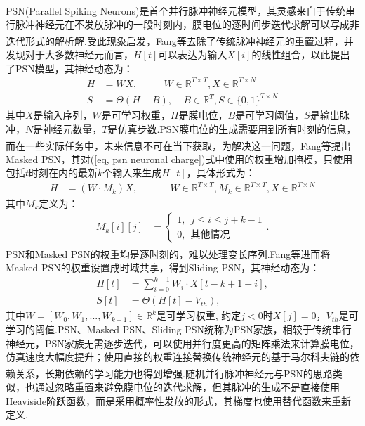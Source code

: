 \documentclass[10.5pt,compsoc,UTF8]{CjC}
\theoremstyle{mystyle}
\newcommand{\upcite}[1]{\textsuperscript{\cite{#1}}}
\begin{document}
\begin{multicols}{1}
PSN(Parallel Spiking Neurons)\upcite{fang2023parallel}是首个并行脉冲神经元模型，其灵感来自于传统串行脉冲神经元在不发放脉冲的一段时刻内，膜电位的逐时间步迭代求解可以写成非迭代形式的解析解.受此现象启发，Fang等\upcite{fang2023parallel}去除了传统脉冲神经元的重置过程，并发现对于大多数神经元而言，$H[t]$可以表达为输入$X[i]$的线性组合，以此提出了PSN模型，其神经动态为：
\begin{align}
	H &= WX, ~~~~~~~~~~~~W \in \mathbb{R}^{T \times T}, X \in \mathbb{R}^{T \times N} \label{eq, psn neuronal charge}\\
	S &= \Theta(H -B), ~~~~~B \in \mathbb{R}^{T}, S\in \{0, 1\}^{T \times N}
\end{align}
其中$X$是输入序列，$W$是可学习权重，$H$是膜电位，$B$是可学习阈值，$S$是输出脉冲，$N$是神经元数量，$T$是仿真步数.PSN膜电位的生成需要用到所有时刻的信息，而在一些实际任务中，未来信息不可在当下获取，为解决这一问题，Fang等\upcite{fang2023parallel}提出Masked PSN，其对(\ref{eq, psn neuronal charge})式中使用的权重增加掩模，只使用包括$t$时刻在内的最新$k$个输入来生成$H[t]$，具体形式为：
\begin{eqnarray}
	H &= (W \cdot M_{k})X, ~~~~~~~~~~~~~~~W \in \mathbb{R}^{T \times T}, M_{k} \in \mathbb{R}^{T \times T}, X \in \mathbb{R}^{T \times N}
\end{eqnarray}
其中$M_{k}$定义为：
\begin{eqnarray}
	M_{k}[i][j] &= \begin{cases}
		1, ~~ j \leq i \leq j + k - 1 \\
		0, ~~\text{其他情况}
	\end{cases}.
\end{eqnarray}
PSN和Masked PSN的权重均是逐时刻的，难以处理变长序列.Fang等\upcite{fang2023parallel}进而将Masked PSN的权重设置成时域共享，得到Sliding PSN，其神经动态为：
\begin{align}
	H[t] &= \sum_{i=0}^{k-1}W_{i}\cdot X[t - k + 1 + i], \\
	S[t] &= \Theta(H[t] - V_{th}),
\end{align}
其中$W = [W_{0}, W_{1}, ..., W_{k-1}] \in \mathbb{R}^{k}$是可学习权重, 约定$j < 0$时$X[j]=0$，$V_{th}$是可学习的阈值.PSN、Masked PSN、Sliding PSN统称为PSN家族，相较于传统串行神经元，PSN家族无需逐步迭代，可以使用并行度更高的矩阵乘法来计算膜电位，仿真速度大幅度提升；使用直接的权重连接替换传统神经元的基于马尔科夫链的依赖关系，长期依赖的学习能力也得到增强.随机并行脉冲神经元\upcite{10191884}与PSN的思路类似，也通过忽略重置来避免膜电位的迭代求解，但其脉冲的生成不是直接使用Heaviside阶跃函数，而是采用概率性发放的形式，其梯度也使用替代函数来重新定义.


\end{multicols}
\end{document}

